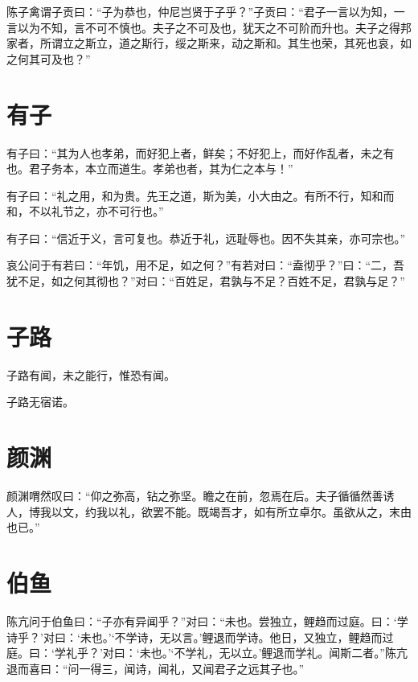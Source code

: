 \documentclass[a5paper]{ctexbook}
\begin{document}
    陈子禽谓子贡曰：“子为恭也，仲尼岂贤于子乎？”子贡曰：“君子一言以为知，一言以为不知，言不可不慎也。夫子之不可及也，犹天之不可阶而升也。夫子之得邦家者，所谓立之斯立，道之斯行，绥之斯来，动之斯和。其生也荣，其死也哀，如之何其可及也？”

    \chapter{有子}

    有子曰：“其为人也孝弟，而好犯上者，鲜矣；不好犯上，而好作乱者，未之有也。君子务本，本立而道生。孝弟也者，其为仁之本与！”

    有子曰：“礼之用，和为贵。先王之道，斯为美，小大由之。有所不行，知和而和，不以礼节之，亦不可行也。”

    有子曰：“信近于义，言可复也。恭近于礼，远耻辱也。因不失其亲，亦可宗也。”

    哀公问于有若曰：“年饥，用不足，如之何？”有若对曰：“盍彻乎？”曰：“二，吾犹不足，如之何其彻也？”对曰：“百姓足，君孰与不足？百姓不足，君孰与足？”

    \chapter{子路}

    子路有闻，未之能行，惟恐有闻。

    子路无宿诺。

    \chapter{颜渊}

    颜渊喟然叹曰：“仰之弥高，钻之弥坚。瞻之在前，忽焉在后。夫子循循然善诱人，博我以文，约我以礼，欲罢不能。既竭吾才，如有所立卓尔。虽欲从之，末由也已。”

    \chapter{伯鱼}

    陈亢问于伯鱼曰：“子亦有异闻乎？”对曰：“未也。尝独立，鲤趋而过庭。曰：‘学诗乎？’对曰：‘未也。’‘不学诗，无以言。’鲤退而学诗。他日，又独立，鲤趋而过庭。曰：‘学礼乎？’对曰：‘未也。’‘不学礼，无以立。’鲤退而学礼。闻斯二者。”陈亢退而喜曰：“问一得三，闻诗，闻礼，又闻君子之远其子也。”
\end{document}
